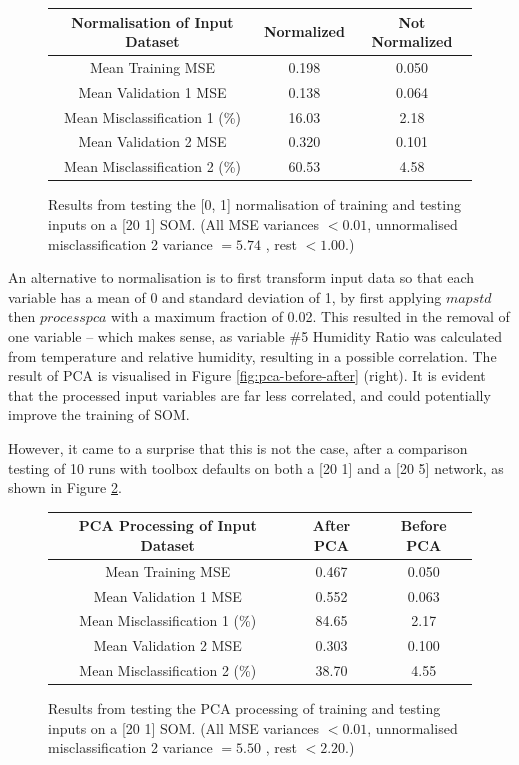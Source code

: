 \documentclass[10pt, oneside]{article}
\begin{document}
\begin{figure}[h]
\begin{center}
\fontsize{9}{11}\selectfont
\begin{tabular}{|c|c|c|}
\hline 
Normalisation of Input Dataset & Normalized & Not Normalized \\ \hline
Mean Training MSE & 0.198 & 0.050 \\ \hline \hline 
Mean Validation 1 MSE & 0.138 & 0.064 \\ \hline 
Mean Misclassification 1 (\%) & 16.03 & 2.18 \\ \hline \hline 
Mean Validation 2 MSE & 0.320 & 0.101 \\ \hline 
Mean Misclassification 2 (\%) & 60.53 & 4.58 \\ \hline
\end{tabular}
\end{center}
\caption{\label{fig:normalize-testing} Results from testing the [0, 1] normalisation of training and testing inputs on a [20 1] SOM. (All MSE variances $<0.01$, unnormalised misclassification 2 variance $=5.74$ , rest $<1.00$.)}
\end{figure}

An alternative to normalisation is to first transform input data so that each variable has a mean of 0 and standard deviation of 1, by first applying $mapstd$ then $processpca$ with a maximum fraction of 0.02. This resulted in the removal of one variable -- which makes sense, as variable \#5 Humidity Ratio was calculated from temperature and relative humidity, resulting in a possible correlation. The result of PCA is visualised in Figure \ref{fig:pca-before-after} (right). It is evident that the processed input variables are far less correlated, and could potentially improve the training of SOM.

However, it came to a surprise that this is not the case, after a comparison testing of 10 runs with toolbox defaults on both a [20 1] and a [20 5] network, as shown in Figure \ref{fig:pca-testing}.

\begin{figure}[h]
\begin{center}
\fontsize{9}{11}\selectfont
\begin{tabular}{|c|c|c|}
\hline 
PCA Processing of Input Dataset & After PCA & Before PCA \\ \hline
Mean Training MSE & 0.467 & 0.050 \\ \hline \hline 
Mean Validation 1 MSE & 0.552 & 0.063 \\ \hline 
Mean Misclassification 1 (\%) & 84.65 & 2.17 \\ \hline \hline 
Mean Validation 2 MSE & 0.303 & 0.100 \\ \hline 
Mean Misclassification 2 (\%) & 38.70 & 4.55 \\ \hline
\end{tabular}
\end{center}
\caption{\label{fig:pca-testing} Results from testing the PCA processing of training and testing inputs on a [20 1] SOM. (All MSE variances $<0.01$, unnormalised misclassification 2 variance $=5.50$ , rest $<2.20$.)}
\end{figure}
\end{document}
